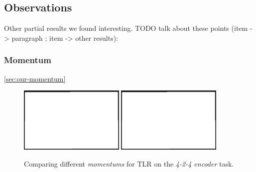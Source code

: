 
\subsection{Observations}
\label{sec:results-other} 

Other partial results we found interesting. 
TODO talk about these points (item -> paragraph ; item -> other results): 

 

\subsubsection{Momentum}
\label{sec:results-momentum} 

\ref{sec:our-momentum} 

\begin{figure}[H]
  \centering
  \includegraphics[width=0.45\textwidth]{img/placeholder.png}  %
  \includegraphics[width=0.45\textwidth]{img/placeholder.png}  %
  \caption{Comparing different \emph{momentums} for TLR on the \emph{4-2-4 encoder} task.}
  \label{fig:results-tlr-auto4-momentum}
\end{figure}




